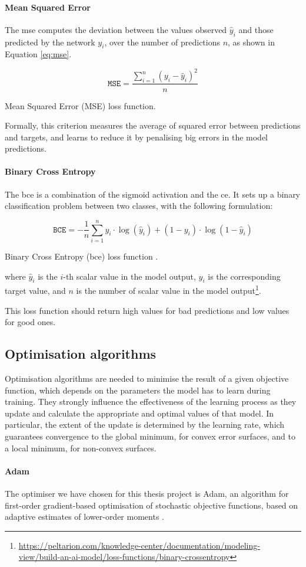 \paragraph*{Mean Squared Error} 
The \gls{mse} computes the deviation between the values observed $\hat y_i$ and 
those predicted by the network $y_i$, over the number of predictions $n$, as 
shown in Equation \ref{eq:mse}.
\begin{Equation}[!htb]
	\centering
	\begin{equation}
	\mathtt{MSE} = \frac{\sum_{i=1}^n (y_i-\hat y_i)^2}{n}
	\end{equation}
	\caption{Mean Squared Error (MSE) loss function.}
	\label{eq:mse}
\end{Equation}
Formally, this criterion measures the average of squared error between 
predictions and targets, and learns to reduce it by penalising big errors in the 
model predictions.

\paragraph*{Binary Cross Entropy} 
The \gls{bce} is a combination of the sigmoid activation and the \gls{ce}. It sets up 
a binary classification problem between two classes, with the following 
formulation:

\begin{Equation}[!htb]
	\centering
	\begin{equation}
	\mathtt{BCE} = -\frac{1}{n} \sum_{i=1}^n y_i \cdot \log(\hat y_i) + (1-y_i) 
	\cdot \log(1 - \hat y_i)
	\end{equation}
	\caption[Binary Cross Entropy (BCE) loss function.\bigskip]{Binary Cross 
	Entropy 
	(\gls{bce}) loss function \cite[][]{sadowski2016notes}.}
	\label{eq:bce}
\end{Equation}

\noindent
where $\hat y_i$ is the $i$-th scalar value in the model output, $y_i$ is the 
corresponding target value, and $n$ is the number of scalar value in the model 
output\footnote{\url{https://peltarion.com/knowledge-center/documentation/modeling-view/build-an-ai-model/loss-functions/binary-crossentropy}}.
 
This loss function should return high values for bad predictions and low values for 
good ones.

\subsection{Optimisation algorithms}
\label{subsec:optimiser}
Optimisation algorithms are needed to minimise the result of a given objective 
function, which depends on the parameters the model has to learn during 
training.
They strongly influence the effectiveness of the learning process as they update 
and calculate the appropriate and optimal values of that model. 
In particular, the extent of the update is determined by the learning rate, which 
guarantees convergence to the global minimum, for convex error surfaces, and to 
a local minimum, for non-convex surfaces.

\paragraph*{Adam}

The optimiser we have chosen for this thesis project is Adam, {an algorithm for 
first-order gradient-based optimisation of stochastic objective functions, based 
on adaptive estimates of lower-order moments} \cite[][]{kingma2014adam, 
loshchilov2017decoupled}. 
